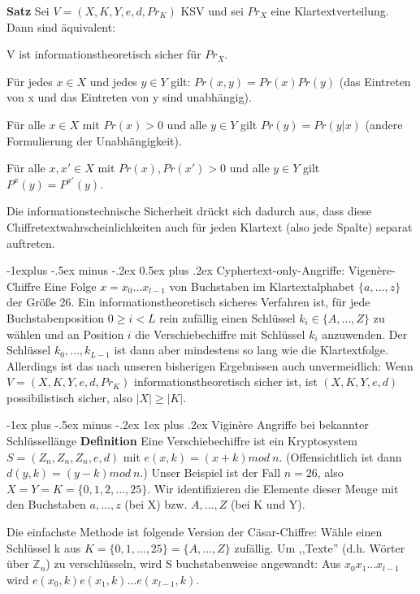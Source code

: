 \documentclass[a4paper]{article}
\makeatletter
\renewcommand{\subsection}{\@startsection{subsection}{2}{0mm}%
 {-1explus -.5ex minus -.2ex}%
 {0.5ex plus .2ex}%
 {\normalfont\normalsize\bfseries}}
\renewcommand{\subsubsection}{\@startsection{subsubsection}{3}{0mm}%
 {-1ex plus -.5ex minus -.2ex}%
 {1ex plus .2ex}%
 {\normalfont\small\bfseries}}
\makeatother
\begin{document}
\begin{multicols}{3}
    \textbf{Satz} Sei $V=(X,K,Y,e,d,Pr_K)$ KSV und sei $Pr_X$ eine Klartextverteilung. Dann sind äquivalent:
    \begin{enumerate*}
        \item V ist informationstheoretisch sicher für $Pr_X$.
        \item Für jedes $x\in X$ und jedes $y\in Y$ gilt: $Pr(x,y)=Pr(x)Pr(y)$ (das Eintreten von x und das Eintreten von y sind unabhängig).
        \item Für alle $x\in X$ mit $Pr(x)>0$ und alle $y\in Y$ gilt $Pr(y)=Pr(y|x)$ (andere Formulierung der Unabhängigkeit).
        \item Für alle $x,x'\in X$ mit $Pr(x),Pr(x')>0$ und alle $y\in Y$ gilt $P^x(y)=P^{x'}(y)$.
    \end{enumerate*}
    Die informationstechnische Sicherheit drückt sich dadurch aus, dass diese Chiffretextwahrscheinlichkeiten auch für jeden Klartext (also jede Spalte) separat auftreten.

    \subsection{Cyphertext-only-Angriffe: Vigenère-Chiffre}
    Eine Folge $x=x_0 ...x_{l-1}$ von Buchstaben im Klartextalphabet $\{a,...,z\}$ der Größe 26. Ein informationstheoretisch sicheres Verfahren ist, für jede Buchstabenposition $0\geq i < L$ rein zufällig einen Schlüssel $k_i\in\{A,...,Z\}$ zu wählen und an Position $i$ die Verschiebechiffre mit Schlüssel $k_i$ anzuwenden. Der Schlüssel $k_0,...,k_{L-1}$ ist dann aber mindestens so lang wie die Klartextfolge. Allerdings ist das nach unseren bisherigen Ergebnissen auch unvermeidlich: Wenn $V=(X,K,Y,e,d,Pr_K)$ informationstheoretisch sicher ist, ist $(X,K,Y,e,d)$ possibilistisch sicher, also $|X|\geq |K|$.

    \subsubsection{Viginère Angriffe bei bekannter Schlüssellänge}
    \textbf{Definition} Eine Verschiebechiffre ist ein Kryptosystem $S=(Z_n,Z_n,Z_n,e,d)$ mit $e(x,k)=(x+k) mod\ n$. (Offensichtlich ist dann $d(y,k)=(y-k)mod\ n$.) Unser Beispiel ist der Fall $n=26$, also $X=Y=K=\{0,1,2,...,25\}$. Wir identifizieren die Elemente dieser Menge mit den Buchstaben $a,...,z$ (bei X) bzw. $A,...,Z$ (bei K und Y).

    Die einfachste Methode ist folgende Version der Cäsar-Chiffre: Wähle einen Schlüssel k aus $K=\{0,1,...,25\}=\{A,...,Z\}$ zufällig. Um ,,Texte'' (d.h. Wörter über $\mathbb{Z}_n$) zu verschlüsseln, wird S buchstabenweise angewandt: Aus $x_0 x_1...x_{l-1}$ wird $e(x_0,k)e(x_1,k)...e(x_{l-1},k)$.


\end{multicols}
\end{document}
